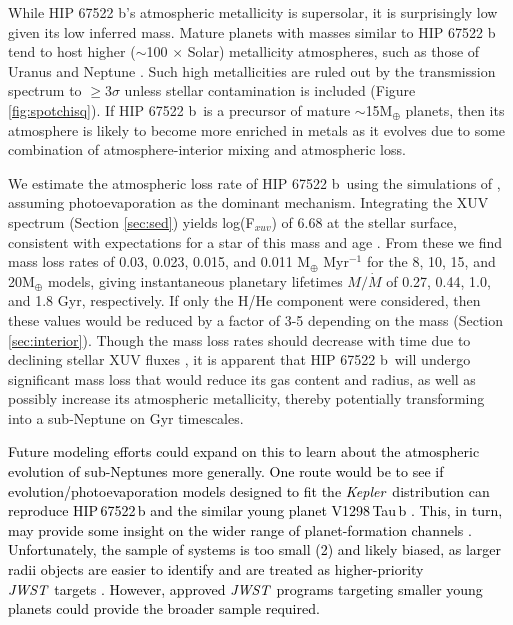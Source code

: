 \documentclass[twocolumn]{aastex63} %
\newcommand{\kepler}{{\it Kepler}}
\newcommand{\jwst}{\textit{JWST}}
\newcommand{\plname}{HIP 67522 b}
\newcommand{\newedit}[1]{\textcolor{black}{#1}}
\begin{document}
While \plname's atmospheric metallicity is supersolar, it is surprisingly low given its low inferred mass. Mature planets with masses similar to \plname\, tend to host higher ($\sim$100 $\times$ Solar) metallicity atmospheres, such as those of Uranus and Neptune \citep{Sromovsky2011, Karkoschka2011}. Such high metallicities are ruled out by the transmission spectrum to $\geq$3$\sigma$ unless stellar contamination is included (Figure \ref{fig:spotchisq}). If \plname\, is a precursor of mature $\sim$15M$_{\oplus}$ planets, then its atmosphere is likely to become more enriched in metals as it evolves due to some combination of atmosphere-interior mixing and atmospheric loss. 


We estimate the atmospheric loss rate of \plname\, using the simulations of \citet{Caldiroli2022A&A...663A.122C}, assuming photoevaporation as the dominant mechanism. Integrating the XUV spectrum (Section \ref{sec:sed}) yields log(F$_{xuv}$) of 6.68 at the stellar surface, consistent with expectations for a star of this mass and age \citep{Johnstone2021A&A...649A..96J}. From these we find mass loss rates of 0.03, 0.023, 0.015, and 0.011 M$_{\oplus}$ Myr$^{-1}$ for the 8, 10, 15, and 20M$_{\oplus}$ models, giving instantaneous planetary lifetimes $M/\dot{M}$ of 0.27, 0.44, 1.0, and 1.8 Gyr, respectively. If only the H/He component were considered, then these values would be reduced by a factor of 3-5 depending on the mass (Section \ref{sec:interior}). Though the mass loss rates should decrease with time due to declining stellar XUV fluxes \citep{Johnstone2021A&A...649A..96J}, it is apparent that \plname\, will undergo significant mass loss that would reduce its gas content and radius, as well as possibly increase its atmospheric metallicity, thereby potentially transforming into a sub-Neptune on Gyr timescales. 



\newedit{Future modeling efforts could expand on this to learn about the atmospheric evolution of sub-Neptunes more generally. One route would be to see if evolution/photoevaporation models designed to fit the \kepler\ distribution \citep[e.g.,][]{Rogers2021} can reproduce HIP\,67522\,b and the similar young planet V1298\,Tau\,b \citep[][also see below]{Barat2024_V1298Taub}. This, in turn, may provide some insight on the wider range of planet-formation channels \citep[e.g.][]{Lee2016,Rogers2024}. Unfortunately, the sample of systems is too small (2) and likely biased, as larger radii objects are easier to identify and are treated as higher-priority \jwst\ targets \citep{Kempton2018}. However, approved \jwst\ programs targeting smaller young planets \citep[e.g.][]{Feinstein2024} could provide the broader sample required.}
\end{document}
